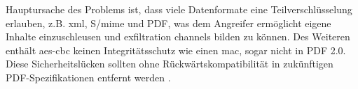 Hauptursache des Problems ist, dass viele Datenformate eine Teilverschlüsselung erlauben, z.B. \gls{xml}, S/\gls{mime} und PDF, was dem Angreifer ermöglicht eigene Inhalte einzuschleusen und exfiltration channels bilden zu können. Des Weiteren enthält \gls{aes}-\gls{cbc} keinen Integritätsschutz wie einen \gls{mac}, sogar nicht in PDF 2.0. Diese Sicherheitslücken sollten ohne Rückwärtskompatibilität in zukünftigen PDF-Spezifikationen entfernt werden \cite{pdfex}.
